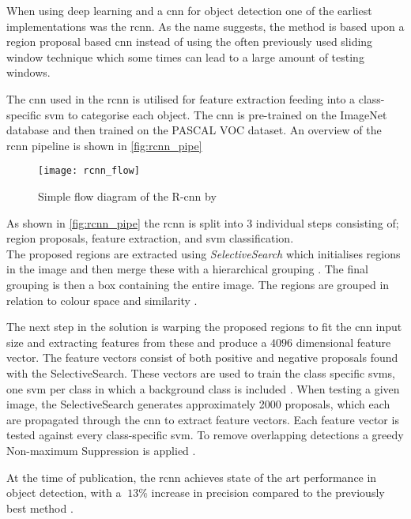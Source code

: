 When using deep learning and a \gls{cnn} for object detection one of the earliest implementations was the \gls{rcnn}. As the name suggests, the method is based upon a region proposal based \gls{cnn} instead of using the often previously used sliding window technique which some times can lead to a large amount of testing windows.

The \gls{cnn} used in the \gls{rcnn} is utilised for feature extraction feeding into a class-specific \gls{svm} to categorise each object. The \gls{cnn} is pre-trained on the ImageNet database and then trained on the PASCAL VOC dataset. An overview of the \gls{rcnn} pipeline is shown in \autoref{fig:rcnn_pipe}

\begin{figure}[h]
	\centering
	\texttt{[image: rcnn\_flow]}
	\caption{Simple flow diagram of the R-\gls{cnn} by \cite{Girshick2014}}
	\label{fig:rcnn_pipe}
\end{figure}

As shown in \autoref{fig:rcnn_pipe} the \gls{rcnn} is split into 3 individual steps consisting of; region proposals, feature extraction, and \gls{svm} classification.\\

The proposed regions are extracted using \textit{SelectiveSearch} which initialises regions in the image and then merge these with a hierarchical grouping \citep{Uijlings2013}. The final grouping is then a box containing the entire image. The regions are grouped in relation to colour space and similarity \citep{Girshick2014}. 

The next step in the solution is warping the proposed regions to fit the \gls{cnn} input size and extracting features from these and produce a $4096$ dimensional feature vector. The feature vectors consist of both positive and negative proposals found with the SelectiveSearch. These vectors are used to train the class specific \gls{svm}s, one \gls{svm} per class in which a background class is included \citep{Girshick2014}.
When testing a given image, the SelectiveSearch generates approximately 2000 proposals, which each are propagated through the \gls{cnn} to extract feature vectors. Each feature vector is tested against every class-specific \gls{svm}. To remove overlapping detections a greedy Non-maximum Suppression is applied \citep{Girshick2014}.

At the time of publication, the \gls{rcnn} achieves state of the art performance in object detection, with a $~13\%$ increase in precision compared to the previously best method \citep{Girshick2014}.

